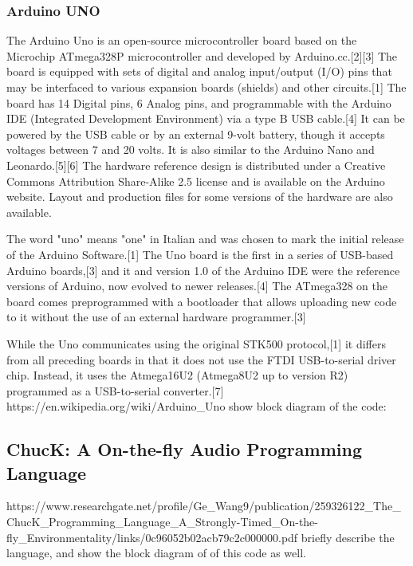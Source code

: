 \subsubsection{Arduino UNO}
The Arduino Uno is an open-source microcontroller board based on the Microchip ATmega328P microcontroller and developed by Arduino.cc.[2][3] The board is equipped with sets of digital and analog input/output (I/O) pins that may be interfaced to various expansion boards (shields) and other circuits.[1] The board has 14 Digital pins, 6 Analog pins, and programmable with the Arduino IDE (Integrated Development Environment) via a type B USB cable.[4] It can be powered by the USB cable or by an external 9-volt battery, though it accepts voltages between 7 and 20 volts. It is also similar to the Arduino Nano and Leonardo.[5][6] The hardware reference design is distributed under a Creative Commons Attribution Share-Alike 2.5 license and is available on the Arduino website. Layout and production files for some versions of the hardware are also available.

The word "uno" means "one" in Italian and was chosen to mark the initial release of the Arduino Software.[1] The Uno board is the first in a series of USB-based Arduino boards,[3] and it and version 1.0 of the Arduino IDE were the reference versions of Arduino, now evolved to newer releases.[4] The ATmega328 on the board comes preprogrammed with a bootloader that allows uploading new code to it without the use of an external hardware programmer.[3]

While the Uno communicates using the original STK500 protocol,[1] it differs from all preceding boards in that it does not use the FTDI USB-to-serial driver chip. Instead, it uses the Atmega16U2 (Atmega8U2 up to version R2) programmed as a USB-to-serial converter.[7]
https://en.wikipedia.org/wiki/Arduino_Uno
show block diagram of the code:


\subsection{ChucK: A On-the-fly Audio Programming Language}
https://www.researchgate.net/profile/Ge_Wang9/publication/259326122_The_ChucK_Programming_Language_A_Strongly-Timed_On-the-fly_Environmentality/links/0c96052b02acb79c2c000000.pdf
briefly describe the language, and show the block diagram of of this code as well. 